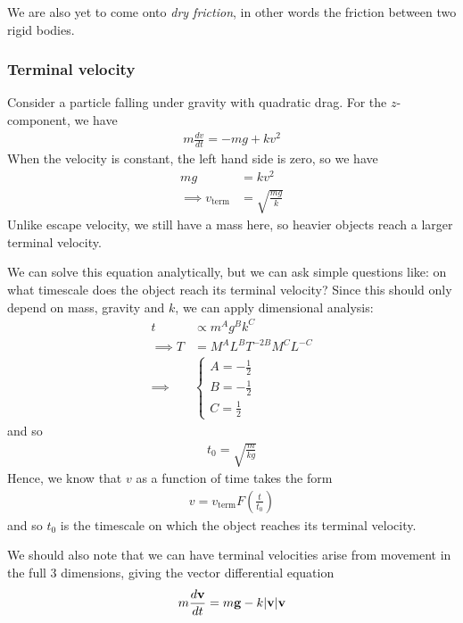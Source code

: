 \documentclass{../template/note}
\begin{document}
    We are also yet to come onto \emph{dry friction}, in other words the friction between two rigid bodies.

    \subsubsection{Terminal velocity}

    Consider a particle falling under gravity with quadratic drag. For the \(z\)-component, we have
    \begin{align*}
        m \frac{dv}{dt} = -mg+kv^2
    \end{align*}
    When the velocity is constant, the left hand side is zero, so we have
    \begin{align*}
        mg &= kv^2 \\
        \implies v_\text{term} &= \sqrt{\frac{mg}{k}}
    \end{align*}
    Unlike escape velocity, we still have a mass here, so heavier objects reach a larger terminal velocity.

    We can solve this equation analytically, but we can ask simple questions like: on what timescale does the object reach its terminal velocity? Since this should only depend on mass, gravity and \(k\), we can apply dimensional analysis:
    \begin{align*}
        t &\propto m^A g^B k^C \\
        \implies \si{T} &= \si{M^AL^BT^{-2B}M^CL^{-C}} \\
        \implies &\begin{cases}
            A = -\frac 1 2 \\
            B = -\frac 1 2 \\
            C = \frac 1 2 
        \end{cases}
    \end{align*}
    and so
    \begin{align*}
        t_0 = \sqrt{\frac{m}{kg}}
    \end{align*}
    Hence, we know that \(v\) as a function of time takes the form
    \begin{align*}
        v = v_\text{term} F\left(\frac t {t_0}\right)
    \end{align*}
    and so \(t_0\) is the timescale on which the object reaches its terminal velocity.    

    We should also note that we can have terminal velocities arise from movement in the full 3 dimensions, giving the vector differential equation
    \begin{align*}
        m \frac{d \V v}{dt} = m \V g - k|\V v|\V v
    \end{align*}
    
\end{document}
